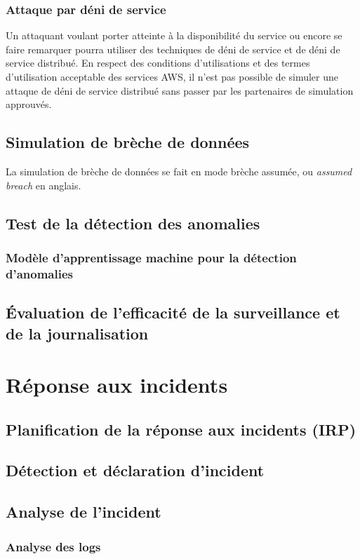 \documentclass[conference]{IEEEtran}
\begin{document}
\subsubsection{Attaque par déni de service}
Un attaquant voulant porter atteinte à la disponibilité du service ou encore se faire remarquer pourra utiliser des techniques de déni de service et de déni de service distribué. En respect des conditions d'utilisations et des termes d'utilisation acceptable des services AWS, il n'est pas possible de simuler une attaque de déni de service distribué sans passer par les partenaires de simulation approuvés.
\subsection{Simulation de brèche de données}
La simulation de brèche de données se fait en mode brèche assumée, ou \textit{assumed breach} en anglais.
\subsection{Test de la détection des anomalies}
\subsubsection{Modèle d'apprentissage machine pour la détection d'anomalies}
\subsection{Évaluation de l'efficacité de la surveillance et de la journalisation}

\section{Réponse aux incidents}

\subsection{Planification de la réponse aux incidents (IRP)}

\subsection{Détection et déclaration d'incident}
\subsection{Analyse de l'incident}
\subsubsection{Analyse des logs}
\end{document}
